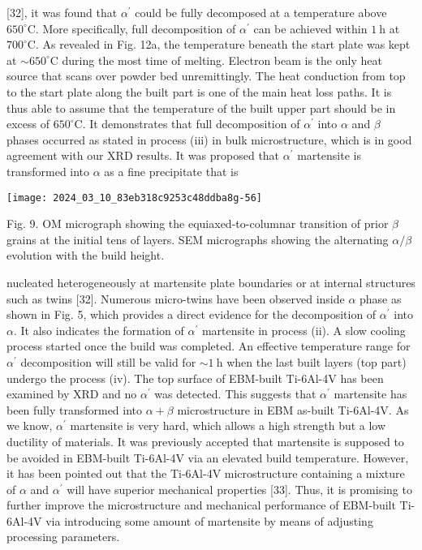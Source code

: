 \documentclass[10pt]{article}
\begin{document}
[32], it was found that $\alpha^{\prime}$ could be fully decomposed at a temperature above $650^{\circ} \mathrm{C}$. More specifically, full decomposition of $\alpha^{\prime}$ can be achieved within $1 \mathrm{~h}$ at $700^{\circ} \mathrm{C}$. As revealed in Fig. 12a, the temperature beneath the start plate was kept at $\sim 650^{\circ} \mathrm{C}$ during the most time of melting. Electron beam is the only heat source that scans over powder bed unremittingly. The heat conduction from top to the start plate along the built part is one of the main heat loss paths. It is thus able to assume that the temperature of the built upper part should be in excess of $650^{\circ} \mathrm{C}$. It demonstrates that full decomposition of $\alpha^{\prime}$ into $\alpha$ and $\beta$ phases occurred as stated in process (iii) in bulk microstructure, which is in good agreement with our XRD results. It was proposed that $\alpha^{\prime}$ martensite is transformed into $\alpha$ as a fine precipitate that is

\begin{center}
\texttt{[image: 2024\_03\_10\_83eb318c9253c48ddba8g-56]}
\end{center}

Fig. 9. OM micrograph showing the equiaxed-to-columnar transition of prior $\beta$ grains at the initial tens of layers. SEM micrographs showing the alternating $\alpha / \beta$ evolution with the build height.

nucleated heterogeneously at martensite plate boundaries or at internal structures such as twins [32]. Numerous micro-twins have been observed inside $\alpha$ phase as shown in Fig. 5, which provides a direct evidence for the decomposition of $\alpha^{\prime}$ into $\alpha$. It also indicates the formation of $\alpha^{\prime}$ martensite in process (ii). A slow cooling process started once the build was completed. An effective temperature range for $\alpha^{\prime}$ decomposition will still be valid for $\sim 1 \mathrm{~h}$ when the last built layers (top part) undergo the process (iv). The top surface of EBM-built Ti-6Al-4V has been examined by XRD and no $\alpha^{\prime}$ was detected. This suggests that $\alpha^{\prime}$ martensite has been fully transformed into $\alpha+\beta$ microstructure in EBM as-built Ti-6Al-4V. As we know, $\alpha^{\prime}$ martensite is very hard, which allows a high strength but a low ductility of materials. It was previously accepted that martensite is supposed to be avoided in EBM-built Ti-6Al-4V via an elevated build temperature. However, it has been pointed out that the Ti-6Al-4V microstructure containing a mixture of $\alpha$ and $\alpha^{\prime}$ will have superior mechanical properties [33]. Thus, it is promising to further improve the microstructure and mechanical performance of EBM-built Ti-6Al-4V via introducing some amount of martensite by means of adjusting processing parameters.
\end{document}
